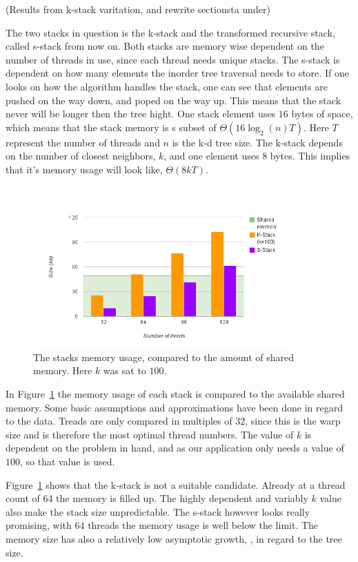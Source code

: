 (Results from k-stack varitation, and rewrite sectionsta under)

The two stacks in question is the k-stack and the transformed recursive stack, called s-stack from now on. Both stacks are memory wise dependent on the number of threads in use, since each thread needs unique stacks. The s-stack is dependent on how many elements the inorder tree traversal needs to store. If one looks on how the algorithm handles the stack, one can see that elements are pushed on the way down, and poped on the way up.  This means that the stack never will be longer then the tree hight. One stack element uses $16$ bytes of space, which means that the stack memory is s subset of $\Theta(16\log_2(n)T)$. Here $T$ represent the number of threads and $n$ is the k-d tree size. The k-stack depends on the number of closest neighbors, $k$, and one element uses $8$ bytes. This implies that it's memory usage will look like, $\Theta(8kT)$.


\begin{figure}[ht!]
\centering
\includegraphics[width=100mm]{../gfx/shared_memory_and_stack.png}

\caption{The stacks memory usage, compared to the amount of shared memory. Here $k$ was sat to $100$.}
\label{fig:stacks_and_shared_memory}
\end{figure}


In Figure~\ref{fig:stacks_and_shared_memory} the memory usage of each stack is compared to the available shared memory. Some basic assumptions and approximations have been done in regard to the data. Treads are only compared in multiples of $32$, since this is the warp size and is therefore the most optimal thread numbers. The value of $k$ is dependent on the problem in hand, and as our application only needs a value of $100$, so that value is used. 


Figure~\ref{fig:stacks_and_shared_memory} shows that the k-stack is not a suitable candidate. Already at a thread count of $64$ the memory is filled up. The highly dependent and variably $k$ value also make the stack size unpredictable. The s-stack however looks really promising, with $64$ threads the memory usage is well below the limit. The memory size has also a relatively low asymptotic growth, , in regard to the tree size.

